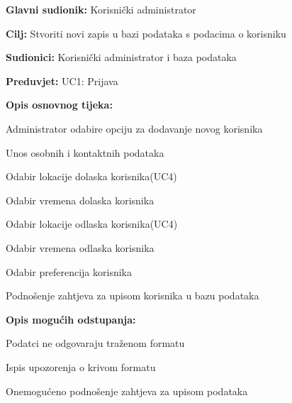 					\noindent {}
					\begin{packed_item}
						
						\item \textbf{Glavni sudionik: }Korisnički administrator
						\item  \textbf{Cilj:} Stvoriti novi zapis u bazi podataka s podacima o korisniku
						\item  \textbf{Sudionici:} Korisnički administrator i baza podataka
						\item  \textbf{Preduvjet:} UC1: Prijava
						\item  \textbf{Opis osnovnog tijeka:}
						
						\item[] \begin{packed_enum}
							
							\item Administrator odabire opciju za dodavanje novog korisnika
							\item Unos osobnih i kontaktnih podataka
							\item Odabir lokacije dolaska korisnika(UC4)
							\item Odabir vremena dolaska korisnika
							\item Odabir lokacije odlaska korisnika(UC4)
							\item Odabir vremena odlaska korisnika
							\item Odabir preferencija korisnika
							\item Podnošenje zahtjeva za upisom korisnika u bazu podataka
							
						\end{packed_enum}
						
						\item  \textbf{Opis mogućih odstupanja:}
						
						\item[] \begin{packed_item}
							
							\item[2.a] Podatci ne odgovaraju traženom formatu 
							\item[] \begin{packed_enum}
								
								\item Ispis upozorenja o krivom formatu
								\item Onemogućeno podnošenje zahtjeva za upisom podataka
								

\end{packed_enum}
\end{packed_item}
\end{packed_item}
